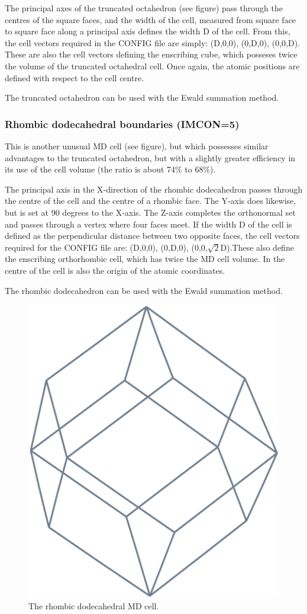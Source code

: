 The principal axes of the truncated octahedron (see figure) pass
through the centres of the square faces, and the width of the cell,
measured from square face to square face along a principal axis
defines the width D of the cell. From this, the cell vectors required
in the \D{} CONFIG file are simply: (D,0,0), (0,D,0), (0,0,D). These are
also the cell vectors defining the enscribing cube, which posseses
twice the volume of the truncated octahedral cell.  Once again, the
atomic positions are defined with respect to the cell centre.

The truncated octahedron can be used with the Ewald summation method.

\subsubsection*{Rhombic dodecahedral boundaries (IMCON=5)}
This is another unusual MD cell (see figure), but which possesses
similar advantages to the truncated octahedron, but with a slightly
greater efficiency in its use of the cell volume (the ratio is about
74\% to 68\%).

The principal axis in the X-direction of the rhombic dodecahedron
passes through the centre of the cell and the centre of a rhombic
face. The Y-axis does likewise, but is set at 90 degrees to the
X-axis.  The Z-axis completes the orthonormal set and passes through a
vertex where four faces meet. If the width D of the cell is defined as
the perpendicular distance between two opposite faces, the cell
vectors required for the \D{} CONFIG file are: (D,0,0), (0,D,0),
(0,0,$\sqrt{2}$D).These also define the enscribing orthorhombic cell,
which has twice the MD cell volume.  In \D{} the centre of the cell is
also the origin of the atomic coordinates.

The rhombic dodecahedron can be used with the Ewald summation
method.

\begin{figure}[ht]
\begin{center}
\includegraphics[height=5 cm]{rhombic.ps}
\caption{The rhombic dodecahedral MD cell.}
\end{center}
\end{figure}

